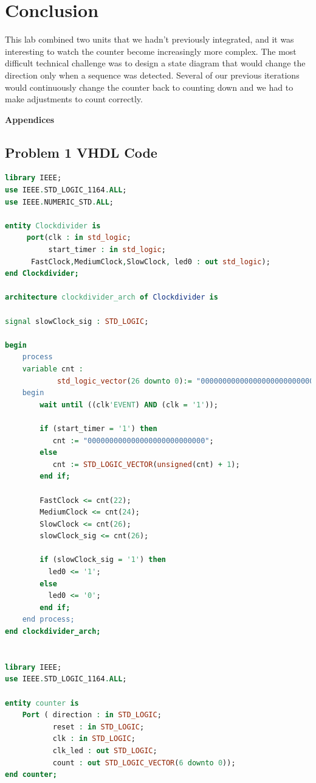 \documentclass[11pt]{article}
\begin{document}
\section{Conclusion}
This lab combined two units that we hadn't previously integrated, and it was interesting to watch the counter become increasingly more complex. The most difficult technical challenge was to design a state diagram that would change the direction only when a sequence was detected. Several of our previous iterations would continuously change the counter back to counting down and we had to make adjustments to count correctly.

\pagebreak

\textbf{Appendices}

\begin{appendices}

\section{Problem 1 VHDL Code}

\begin{lstlisting}[language=VHDL]
library IEEE;
use IEEE.STD_LOGIC_1164.ALL;
use IEEE.NUMERIC_STD.ALL;

entity Clockdivider is
     port(clk : in std_logic;
          start_timer : in std_logic;
	  FastClock,MediumClock,SlowClock, led0 : out std_logic);
end Clockdivider;

architecture clockdivider_arch of Clockdivider is

signal slowClock_sig : STD_LOGIC;

begin
    process  
    variable cnt :	
    		std_logic_vector(26 downto 0):= "000000000000000000000000000";
    begin					 
        wait until ((clk'EVENT) AND (clk = '1'));
	       
		if (start_timer = '1') then
	       cnt := "000000000000000000000000000";
	    else  
           cnt := STD_LOGIC_VECTOR(unsigned(cnt) + 1);
	    end if;

   	    FastClock <= cnt(22);
   	    MediumClock <= cnt(24);	
   	    SlowClock <= cnt(26);
        slowClock_sig <= cnt(26);
	
        if (slowClock_sig = '1') then
		  led0 <= '1';
	    else
		  led0 <= '0';
	    end if;
	end process;
end clockdivider_arch;


library IEEE;
use IEEE.STD_LOGIC_1164.ALL;

entity counter is
    Port ( direction : in STD_LOGIC;
           reset : in STD_LOGIC;
           clk : in STD_LOGIC;
           clk_led : out STD_LOGIC;
           count : out STD_LOGIC_VECTOR(6 downto 0));
end counter;


\end{lstlisting}
\end{appendices}
\end{document}
